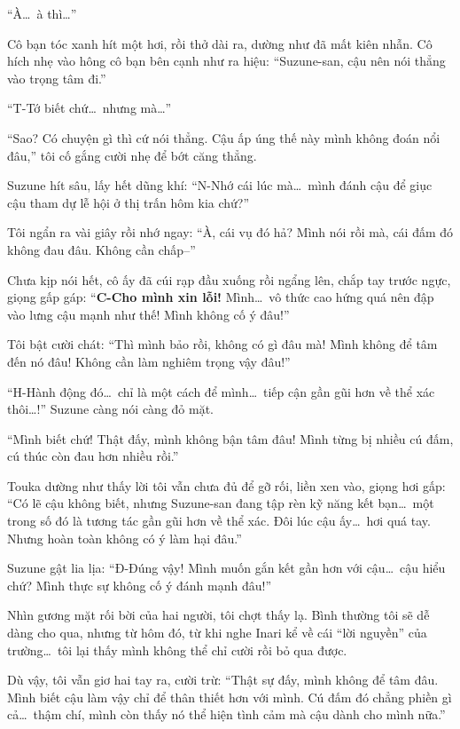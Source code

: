 \documentclass[../main.tex]{subfiles}
\begin{document}
``À\dots\ à thì\dots''

Cô bạn tóc xanh hít một hơi, rồi thở dài ra, dường như đã mất kiên nhẫn. Cô hích nhẹ vào hông cô bạn bên cạnh như ra hiệu: ``Suzune-san, cậu nên nói thẳng vào trọng tâm đi.''

``T-Tớ biết chứ\dots\ nhưng mà\dots''

``Sao? Có chuyện gì thì cứ nói thẳng. Cậu ấp úng thế này mình không đoán nổi đâu,'' tôi cố gắng cười nhẹ để bớt căng thẳng.

Suzune hít sâu, lấy hết dũng khí: ``N-Nhớ cái lúc mà\dots\ mình đánh cậu để giục cậu tham dự lễ hội ở thị trấn hôm kia chứ?''

Tôi ngẩn ra vài giây rồi nhớ ngay: ``À, cái vụ đó hả? Mình nói rồi mà, cái đấm đó không đau đâu. Không cần chấp--''

Chưa kịp nói hết, cô ấy đã cúi rạp đầu xuống rồi ngẩng lên, chắp tay trước ngực, giọng gấp gáp: ``\textbf{C-Cho mình xin lỗi!} Mình\dots\ vô thức cao hứng quá nên đập vào lưng cậu mạnh như thế! Mình không cố ý đâu!''


Tôi bật cười chát: ``Thì mình bảo rồi, không có gì đâu mà! Mình không để tâm đến nó đâu! Không cần làm nghiêm trọng vậy đâu!''

``H-Hành động đó\dots\ chỉ là một cách để mình\dots\ tiếp cận gần gũi hơn về thể xác thôi\dots!'' Suzune càng nói càng đỏ mặt.

``Mình biết chứ! Thật đấy, mình không bận tâm đâu! Mình từng bị nhiều cú đấm, cú thúc còn đau hơn nhiều rồi.''

Touka dường như thấy lời tôi vẫn chưa đủ để gỡ rối, liền xen vào, giọng hơi gấp: ``Có lẽ cậu không biết, nhưng Suzune-san đang tập rèn kỹ năng kết bạn\dots\ một trong số đó là tương tác gần gũi hơn về thể xác. Đôi lúc cậu ấy\dots\ hơi quá tay. Nhưng hoàn toàn không có ý làm hại đâu.''

Suzune gật lia lịa: ``Đ-Đúng vậy! Mình muốn gắn kết gần hơn với cậu\dots\ cậu hiểu chứ? Mình thực sự không cố ý đánh mạnh đâu!''

Nhìn gương mặt rối bời của hai người, tôi chợt thấy lạ. Bình thường tôi sẽ dễ dàng cho qua, nhưng từ hôm đó, từ khi nghe Inari kể về cái ``lời nguyền'' của trường\dots\ tôi lại thấy mình không thể chỉ cười rồi bỏ qua được.

Dù vậy, tôi vẫn giơ hai tay ra, cười trừ: ``Thật sự đấy, mình không để tâm đâu. Mình biết cậu làm vậy chỉ để thân thiết hơn với mình. Cú đấm đó chẳng phiền gì cả\dots\ thậm chí, mình còn thấy nó thể hiện tình cảm mà cậu dành cho mình nữa.''
\end{document}

